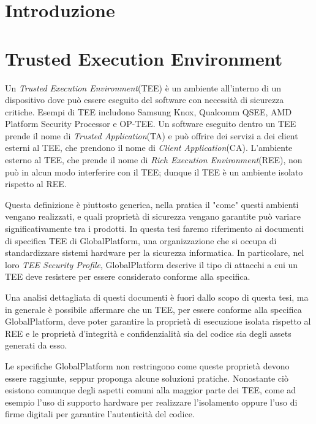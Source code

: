 \documentclass[12pt,italian]{report}
\begin{document}

\chapter{Introduzione}
\label{sec:introduzione}


\chapter{Trusted Execution Environment}
\label{sec:tee}
Un \textit{Trusted Execution Environment}(TEE) è un ambiente all'interno di
un dispositivo dove può essere eseguito del software con necessità di
sicurezza critiche.
Esempi di TEE includono Samsung Knox, Qualcomm QSEE,
AMD Platform Security Processor e OP-TEE.
Un software eseguito dentro un TEE prende il nome di
\textit{Trusted Application}(TA) e può offrire dei servizi a dei client
esterni al TEE, che prendono il nome di \textit{Client Application}(CA).
L'ambiente esterno al TEE, che prende il nome di
\textit{Rich Execution Environment}(REE), non può in alcun modo interferire
con il TEE; dunque il TEE è un ambiente isolato rispetto al REE.

Questa definizione è piuttosto generica, nella pratica il "come" questi
ambienti vengano realizzati, e quali proprietà di sicurezza vengano garantite
può variare significativamente tra i prodotti.
In questa tesi faremo riferimento ai documenti di specifica TEE di
GlobalPlatform, una organizzazione che si occupa di standardizzare sistemi
hardware per la sicurezza informatica.
In particolare, nel loro
\textit{TEE Security Profile}\cite{gp2020securityprofile}, GlobalPlatform
descrive il tipo di attacchi a cui un TEE deve resistere per essere
considerato conforme alla specifica.

Una analisi dettagliata di questi documenti è fuori dallo scopo di questa
tesi, ma in generale è possibile affermare che un TEE, per essere conforme
alla specifica GlobalPlatform, deve poter garantire la proprietà di esecuzione
isolata rispetto al REE e le proprietà d'integrità e confidenzialità sia del
codice sia degli assets generati da esso.

Le specifiche GlobalPlatform non restringono come queste proprietà devono
essere raggiunte, seppur proponga alcune soluzioni pratiche.
Nonostante ciò esistono comunque degli aspetti comuni alla maggior parte dei
TEE, come ad esempio l'uso di supporto hardware per realizzare l'isolamento
oppure l'uso di firme digitali per garantire l'autenticità del codice.
\end{document}

